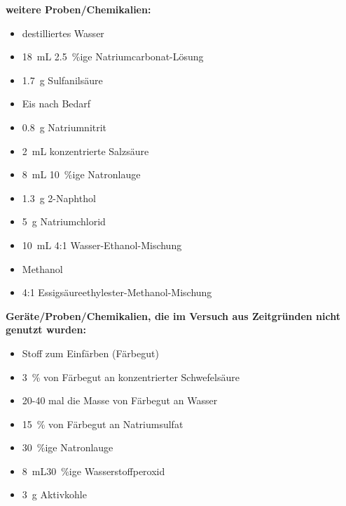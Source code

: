 \textbf{weitere Proben/Chemikalien:}
\begin{itemize}
	\item destilliertes Wasser
	\item \SI{18}{\milli \liter} \SI{2,5}{\percent}ige Natriumcarbonat-Lösung
	\item \SI{1,7}{\gram} Sulfanilsäure
	\item Eis nach Bedarf
	\item \SI{0,8}{\gram} Natriumnitrit
	\item \SI{2}{\milli \liter} konzentrierte Salzsäure
	\item \SI{8}{\milli \liter} \SI{10}{\percent}ige Natronlauge
	\item \SI{1,3}{\gram} 2-Naphthol
	\item \SI{5}{\gram} Natriumchlorid
	\item \SI{10}{\milli \liter} 4:1 Wasser-Ethanol-Mischung
	\item Methanol
	\item 4:1 Essigsäureethylester-Methanol-Mischung
\end{itemize}

\vspace*{5mm}

\textbf{Geräte/Proben/Chemikalien, die im Versuch aus Zeitgründen nicht genutzt wurden:}
\begin{itemize}
	\item Stoff zum Einfärben (Färbegut)
	\item \SI{3}{\percent} von  Färbegut an konzentrierter Schwefelsäure
	\item 20-40 mal die Masse von Färbegut an Wasser
	\item \SI{15}{\percent} von  Färbegut an Natriumsulfat
	\item \SI{30}{\percent}ige Natronlauge
	\item \SI{8}{\milli \liter}\SI{30}{\percent}ige Wasserstoffperoxid
	\item \SI{3}{\gram} Aktivkohle
\end{itemize}



